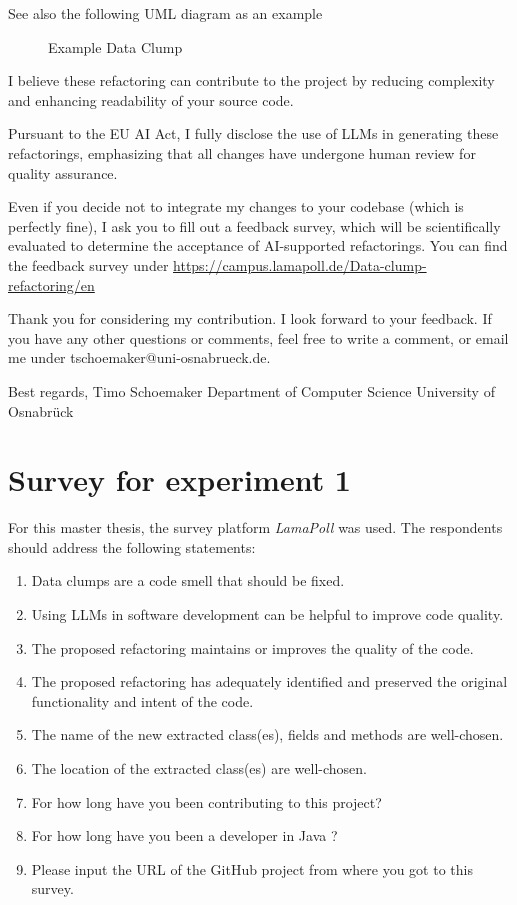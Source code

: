 \begin{appendices}
See also the following UML diagram as an example
\begin{figure}[htpb!]
    \centering
    
    \caption{Example Data Clump}
    \label{fig:enter-label}
\end{figure}
    



I believe these refactoring can contribute to the project by reducing complexity and enhancing readability of your source code.

Pursuant to the EU AI Act, I fully disclose the use of LLMs in generating these refactorings, emphasizing that all changes have undergone human review for quality assurance. 


Even if you decide not to integrate my changes to your codebase (which is perfectly fine), I ask you to fill out a feedback survey, which will be scientifically evaluated to determine the acceptance of AI-supported refactorings. You can find the feedback survey under \url{https://campus.lamapoll.de/Data-clump-refactoring/en}


Thank you for considering my contribution. I look forward to your feedback. If you have any other questions or comments, feel free to write a comment, or email me under tschoemaker@uni-osnabrueck.de.
\newline

Best regards,\newline
Timo Schoemaker \newline
Department of Computer Science \newline
University of Osnabrück \newline


\chapter{Survey for experiment 1}\label{app:pr_survey}

For this master thesis, the survey platform \textit{LamaPoll} \cite{lamapoll} was used.  The respondents should address the following statements:
\begin{enumerate}
\item Data clumps are a code smell that should be fixed.
\item Using LLMs in software development can be helpful to improve code quality.
\item The proposed refactoring maintains or improves the quality of the code.
\item The proposed refactoring has  adequately identified and preserved the original functionality and intent of the code.
\item The name of the new extracted class(es), fields and methods are well-chosen.
 \item The location of the extracted class(es) are well-chosen.
 \item For how long have you been contributing to this project?
\item For how long have you been a developer in Java ? 
\item Please input the URL of the GitHub project from where you got to this survey.


\end{enumerate}
\end{appendices}

